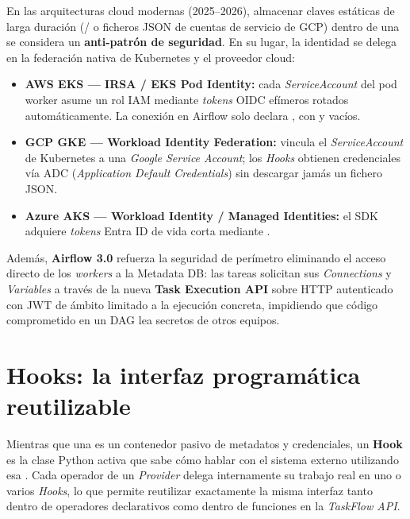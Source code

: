 \begin{modernbox}
En las arquitecturas cloud modernas (2025--2026), almacenar claves estáticas de larga duración (/ o ficheros JSON de cuentas de servicio de GCP) dentro de una  se considera un \textbf{anti-patrón de seguridad}. En su lugar, la identidad se delega en la federación nativa de Kubernetes y el proveedor cloud:
\begin{itemize}
  \item \textbf{AWS EKS --- IRSA / EKS Pod Identity:} cada \textit{ServiceAccount} del pod worker asume un rol IAM mediante \textit{tokens} OIDC efímeros rotados automáticamente. La conexión  en Airflow solo declara , con  y  vacíos.
  \item \textbf{GCP GKE --- Workload Identity Federation:} vincula el \textit{ServiceAccount} de Kubernetes a una \textit{Google Service Account}; los \textit{Hooks} obtienen credenciales vía ADC (\textit{Application Default Credentials}) sin descargar jamás un fichero JSON.
  \item \textbf{Azure AKS --- Workload Identity / Managed Identities:} el SDK adquiere \textit{tokens} Entra ID de vida corta mediante .
\end{itemize}
Además, \textbf{Airflow 3.0}  refuerza la seguridad de perímetro eliminando el acceso directo de los \textit{workers} a la Metadata DB: las tareas solicitan sus \textit{Connections} y \textit{Variables} a través de la nueva \textbf{Task Execution API} sobre HTTP autenticado con JWT de ámbito limitado a la ejecución concreta, impidiendo que código comprometido en un DAG lea secretos de otros equipos.
\end{modernbox}

\section{Hooks: la interfaz programática reutilizable}\label{sec:hooks-interfaz}

Mientras que una  es un contenedor pasivo de metadatos y credenciales, un \textbf{Hook} es la clase Python activa que sabe cómo hablar con el sistema externo utilizando esa . Cada operador de un \textit{Provider} delega internamente su trabajo real en uno o varios \textit{Hooks}, lo que permite reutilizar exactamente la misma interfaz tanto dentro de operadores declarativos como dentro de funciones  en la \textit{TaskFlow API}.


